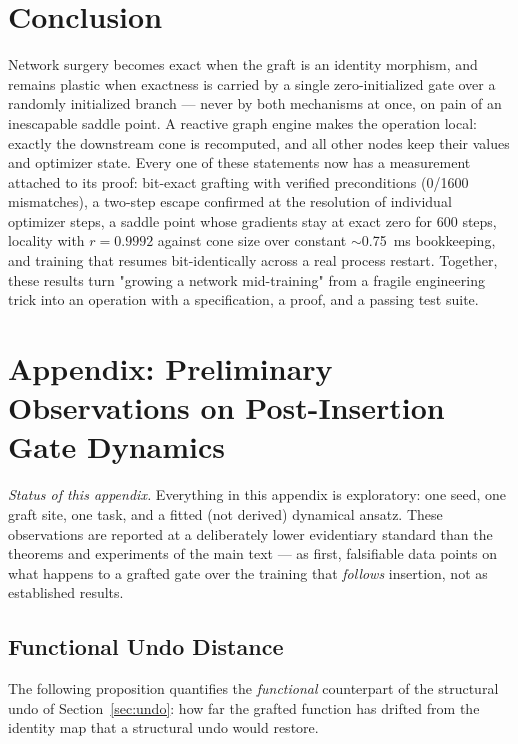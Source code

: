 \documentclass[11pt,a4paper]{article}
\begin{document}
\section{Conclusion}
Network surgery becomes exact when the graft is an identity morphism, and remains plastic when exactness is carried by a single zero-initialized gate over a randomly initialized branch --- never by both mechanisms at once, on pain of an inescapable saddle point. A reactive graph engine makes the operation local: exactly the downstream cone is recomputed, and all other nodes keep their values and optimizer state. Every one of these statements now has a measurement attached to its proof: bit-exact grafting with verified preconditions (0/1600 mismatches), a two-step escape confirmed at the resolution of individual optimizer steps, a saddle point whose gradients stay at exact zero for 600 steps, locality with $r = 0.9992$ against cone size over constant $\sim$0.75~ms bookkeeping, and training that resumes bit-identically across a real process restart. Together, these results turn "growing a network mid-training" from a fragile engineering trick into an operation with a specification, a proof, and a passing test suite.

\appendix

\section{Appendix: Preliminary Observations on Post-Insertion Gate Dynamics}
\label{sec:appendix-gate}

\emph{Status of this appendix.} Everything in this appendix is exploratory: one seed, one graft site, one task, and a fitted (not derived) dynamical ansatz. These observations are reported at a deliberately lower evidentiary standard than the theorems and experiments of the main text --- as first, falsifiable data points on what happens to a grafted gate over the training that \emph{follows} insertion, not as established results.

\subsection{Functional Undo Distance}
\label{sec:functional-undo}

The following proposition quantifies the \emph{functional} counterpart of the structural undo of Section~\ref{sec:undo}: how far the grafted function has drifted from the identity map that a structural undo would restore.
\end{document}
